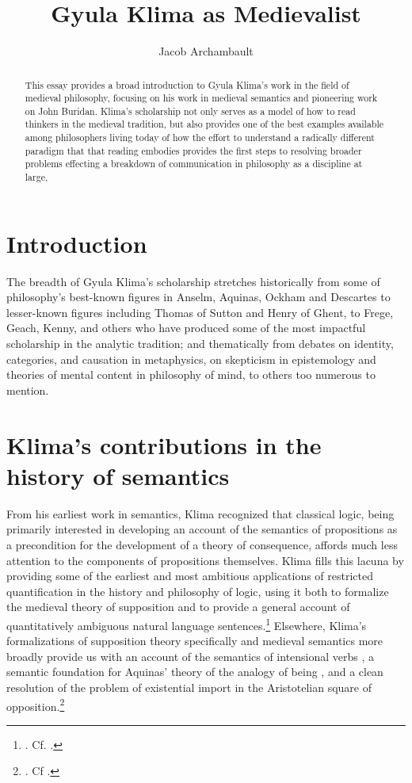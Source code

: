 \documentclass[]{article}
\title{Gyula Klima as Medievalist}
\author{Jacob Archambault}
\begin{document}
\maketitle
\begin{abstract}
This essay provides a broad introduction to Gyula Klima's work in the field of medieval philosophy, 
focusing on his work in medieval semantics 
and pioneering work on John Buridan. 
Klima's scholarship 
not only 
serves 
as a model 
of how to read thinkers in the medieval tradition, 
but also 
provides one of the best examples available among philosophers living today 
of how the effort to understand a radically different paradigm that that reading embodies 
provides the first steps 
to resolving broader problems effecting a breakdown of communication in philosophy as a discipline at large, 
\end{abstract}

\section{Introduction}
The breadth of Gyula Klima's scholarship stretches 
historically from some of philosophy's best-known figures in Anselm, Aquinas, Ockham and Descartes 
to lesser-known figures including Thomas of Sutton and Henry of Ghent, 
to Frege, Geach, Kenny, and others who have produced some of the most impactful scholarship in the analytic tradition; 
and 
thematically from debates 
on identity, categories, and causation in metaphysics, 
on skepticism in epistemology and theories of mental content in philosophy of mind, 
to others too numerous to mention. 


\section{Klima's contributions in the history of semantics}
From his earliest work in semantics, 
Klima recognized that classical logic, 
being primarily interested in developing an account of the semantics of propositions as a precondition for the development of a theory of consequence, 
affords much less attention to the components of propositions themselves. 
Klima fills this lacuna by providing some of the earliest and most ambitious applications of restricted quantification in the history and philosophy of logic, 
using it both to formalize the medieval theory of supposition 
and to provide a general account of quantitatively ambiguous natural language sentences.\footnote{\autocite{Klima1988,Klima1990,KlimaSandu1990,Klima1991b}. Cf. \autocite{Parsons2014}.} 
Elsewhere, 
Klima's formalizations of supposition theory specifically 
and medieval semantics more broadly 
provide us with an account of the semantics of intensional verbs \autocite{Klima1991}, 
a semantic foundation for Aquinas' theory of the analogy of being \autocite{Klima1996,Klima2002}, 
and a clean resolution of the problem of existential import in the Aristotelian square of opposition.\footnote{\autocite{Klima2001}. Cf \autocite{Read2015b}.} 
\end{document}
